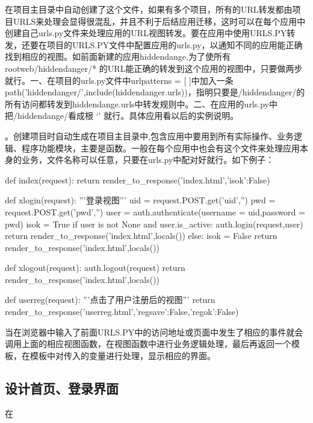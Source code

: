 \documentclass[a4paper]{ctexart}
\begin{document}
             在项目主目录中自动创建了这个文件，如果有多个项目，所有的URL转发都由项目URLS来处理会显得很混乱，并且不利于后结应用迁移，这时可以在每个应用中创建自己urls.py文件来处理应用的URL视图转发。要在应用中使用URLS.PY转发，还要在项目的URLS.PY文件中配置应用的urls.py，以通知不同的应用能正确找到相应的视图。如前面新建的应用hiddendange,为了使所有 rootweb/hiddendanger/* 的URL能正确的转发到这个应用的视图中，只要做两步就行。一、在项目的urls.py文件中urlpatterns = [ ]中加入一条 path('hiddendanger/',include(hiddendanger.urls))，指明只要是/hiddendanger/的所有访问都转发到hiddendange.urls中转发规则中。二、在应用的urls.py中把/hiddendange/看成根 ‘’ 就行。具体应用看以后的实例说明。
                      
                      {\color{red}{三、views.py}}。创建项目时自动生成在项目主目录中,包含应用中要用到所有实际操作、业务逻辑、程序功能模块，主要是函数。一般在每个应用中也会有这个文件来处理应用本身的业务，文件名称可以任意，只要在urls.py中配对好就行。如下例子：                   
 \begin{python}
 def index(request):
     return render_to_response('index.html',{'isok':False})

 def xlogin(request):
    '''登录视图'''    
    uid = request.POST.get('uid','')
    pwd = request.POST.get('pwd','')
    user = auth.authenticate(username = uid,password = pwd)
    isok = True
    if user is not None and user.is_active:
        auth.login(request,user)
        return render_to_response('index.html',locals())
    else:
        isok = False
        return render_to_response('index.html',locals())

 def xlogout(request):
    auth.logout(request)
    return render_to_response('index.html',locals())

 def userreg(request):
    '''点击了用户注册后的视图'''
    return render_to_response('userreg.html',{'regsave':False,'regok':False})
 \end{python}

   当在浏览器中输入了前面URLS.PY中的访问地址或页面中发生了相应的事件就会调用上面的相应视图函数，在视图函数中进行业务逻辑处理，最后再返回一个模板，在模板中对传入的变量进行处理，显示相应的界面。

 \subsection{设计首页、登录界面}
   在
\end{document}
